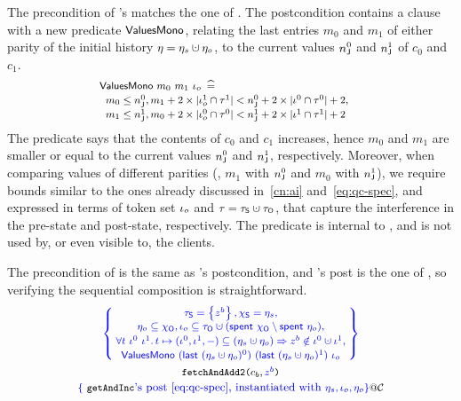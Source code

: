 \noindent
The precondition of 's matches the one of
. The postcondition contains a clause with a new
predicate $\bapprox$, relating the last entries $m_0$ and $m_1$ of
either parity of the initial history $\gist = \gists \hunion \gisto$,
to the current values $n_\joint^0$ and $n_\joint^1$ of $c_0$ and
$c_1$.
%
\[
%
\!\!\!\!
{\small{
\begin{array}{l}
\bapprox~m_0~m_1~\ikno \eqdef \\[2pt]
%
  \begin{array}{l}
   m_0 \le n_\joint^0\aand
    m_1 + 2 \times |\ikno^1 \cap \tkn^1| < n_\joint^0 + 2 \times
  |\ikn^0 \cap  \tkn^0| + 2, \\[2pt]
   m_1 \le n_\joint^1\aand m_0 + 2 \times |\ikno^0 \cap \tkn^0| < n_\joint^1 + 2 \times
  |\ikn^1 \cap  \tkn^1| + 2 
  \end{array}
\end{array}
\hfill
}}
\]
%
The predicate says that the contents of $c_0$ and $c_1$ increases,
hence $m_0$ and $m_1$ are smaller or equal to the current values
$n_\joint^0$ and $n_\joint^1$, respectively. Moreover, when comparing
values of different parities (\ie, $m_1$ with $n_\joint^0$ and $m_0$
with $n_\joint^1$), we require bounds similar to the ones already
discussed in~\ref{cn:ai} and~\eqref{eq:qc-spec}, and expressed in
terms of token set $\ikno$ and $\tkn = \tkns \hunion \tkno$, that
capture the interference in the pre-state and post-state,
respectively. The predicate is internal to , and is not
used by, or even visible to, the clients.

The precondition of  is the same as 's
postcondition, and 's post is the one of
, so verifying the sequential composition is
straightforward.
%
%
\[
%
{\small
\begin{array}{c}
  \spec{\!\!
  \begin{array}{c}
   \tkns = \set{z^b}\aand \hists = \gists \aand   \\[2pt]
    \gisto \subseteq \histo, \ikno  \subseteq \tkno \hunion (\Tomb~\histo \setminus \Tomb~\gisto),\\[2pt]
    \forall t~\ikn^0~\ikn^1 \ldot
    t \hpts (\ikn^0, \ikn^1, -) \subseteq (\gists \hunion \gisto) \Rightarrow z^b \notin \ikn^0 \hunion \ikn^1,
    \\[2pt]    
    \bapprox~(\last~(\gists \hunion \gisto)^0)~(\last~(\gists \hunion \gisto)^1)~\ikno 
  \end{array}
  \!\!}
  \\\\[-5pt]
  \texttt{fetchAndAdd2($c_b, \specK{z^b}$)} 
  \\[3pt]
  {\normalsize{ 
  \specK{\{}~ {\small\texttt{getAndInc}}\specK{\text{'s post~\eqref{eq:qc-spec},
  instantiated with}~\gists, \ikno, \gisto\}}@\ccon
  }}
%
\end{array}
}
\]

